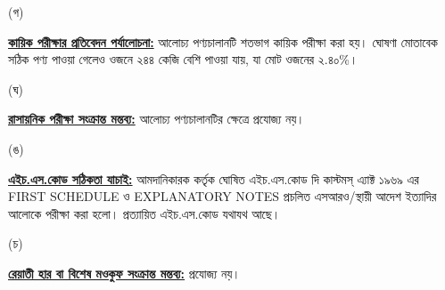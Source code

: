 \documentclass[12pt]{article}
\begin{document}
\begin{minipage}[t]{0.05\linewidth}
\hspace{1em}
\end{minipage}
\begin{minipage}[t]{0.05\linewidth}
(গ)
\end{minipage}
\begin{minipage}[t]{0.90\linewidth}
\underline{\textbf{কায়িক পরীক্ষার প্রতিবেদন পর্যালোচনা:}}
আলোচ্য পণ্যচালানটি শতভাগ কায়িক পরীক্ষা করা হয়।
ঘোষণা মোতাবেক সঠিক পণ্য পাওয়া গেলেও ওজনে ২৪৪ কেজি
বেশি পাওয়া যায়, যা মোট ওজনের ২.৪০\%।
\\
\end{minipage}
\begin{minipage}[t]{0.05\linewidth}
\hspace{1em}
\end{minipage}
\begin{minipage}[t]{0.05\linewidth}
(ঘ)
\end{minipage}
\begin{minipage}[t]{0.90\linewidth}
\underline{\textbf{রাসায়নিক পরীক্ষা সংক্রান্ত মন্তব্য:}}
আলোচ্য পণ্যচালানটির ক্ষেত্রে প্রযোজ্য নয়।
\\
\end{minipage}
\begin{minipage}[t]{0.05\linewidth}
\hspace{1em}
\end{minipage}
\begin{minipage}[t]{0.05\linewidth}
(ঙ)
\end{minipage}
\begin{minipage}[t]{0.90\linewidth}
\underline{\textbf{এইচ.এস.কোড সঠিকতা যাচাই:}}
আমদানিকারক কর্তৃক ঘোষিত এইচ.এস.কোড দি কাস্টমস্ এ্যাক্ট ১৯৬৯ এর FIRST SCHEDULE ও
EXPLANATORY NOTES প্রচলিত এসআরও/স্থায়ী আদেশ ইত্যাদির আলোকে পরীক্ষা করা হলো।
প্রত্যায়িত এইচ.এস.কোড যথাযথ আছে।
\\
\end{minipage}
\newpage
\noindent
\begin{minipage}[t]{0.05\linewidth}
\hspace{1em}
\end{minipage}
\begin{minipage}[t]{0.05\linewidth}
(চ)
\end{minipage}
\begin{minipage}[t]{0.90\linewidth}
\underline{\textbf{রেয়াতী হার বা বিশেষ মওকুফ সংক্রান্ত মন্তব্য:}}
প্রযোজ্য নয়।
\\
\end{minipage}
\end{document}
